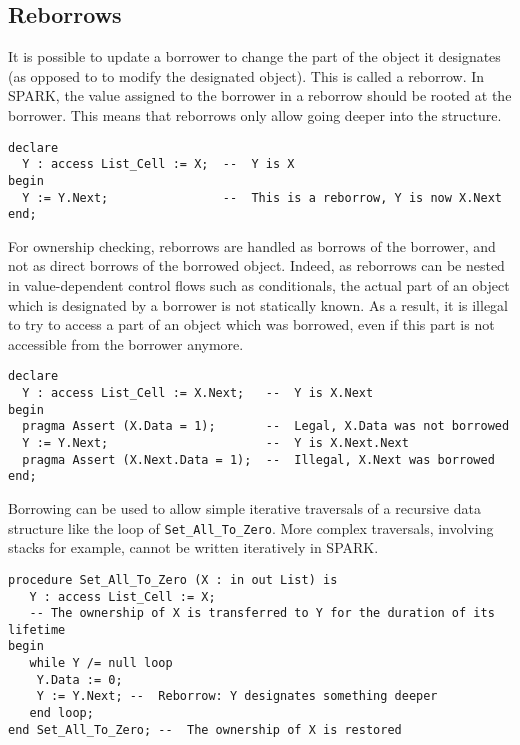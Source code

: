\documentclass[runningheads]{llncs}
\begin{document}
\subsection{Reborrows}
It is possible to update a borrower to change the part of the object it designates (as opposed to to modify the designated object). This is called a reborrow. In SPARK, the value assigned to the borrower in a reborrow should be rooted at the borrower. This means that reborrows only allow going deeper into the structure.
\begin{lstlisting}
declare
  Y : access List_Cell := X;  --  Y is X
begin
  Y := Y.Next;                --  This is a reborrow, Y is now X.Next
end;
\end{lstlisting}
For ownership checking, reborrows are handled as borrows of the borrower, and not as direct borrows of the borrowed object. Indeed, as reborrows can be nested in value-dependent control flows such as conditionals, the actual part of an object which is designated by a borrower is not statically known. As a result, it is illegal to try to access a part of an object which was borrowed, even if this part is not accessible from the borrower anymore.
\begin{lstlisting}
declare
  Y : access List_Cell := X.Next;   --  Y is X.Next
begin
  pragma Assert (X.Data = 1);       --  Legal, X.Data was not borrowed
  Y := Y.Next;                      --  Y is X.Next.Next
  pragma Assert (X.Next.Data = 1);  --  Illegal, X.Next was borrowed
end;
\end{lstlisting}
Borrowing can be used to allow simple iterative traversals of a recursive data structure like the loop of \texttt{Set\_All\_To\_Zero}. More complex traversals, involving stacks for example, cannot be written iteratively in SPARK.
\begin{lstlisting}
procedure Set_All_To_Zero (X : in out List) is
   Y : access List_Cell := X;  
   -- The ownership of X is transferred to Y for the duration of its lifetime
begin
   while Y /= null loop
  	Y.Data := 0;
  	Y := Y.Next; --  Reborrow: Y designates something deeper
   end loop;
end Set_All_To_Zero; --  The ownership of X is restored
\end{lstlisting}
\end{document}
